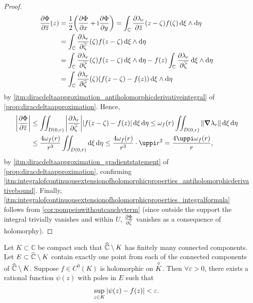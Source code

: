 \begin{proof}
    \begin{align*}
        \pdv{\Phi}{\overline{z}}\qty(z) & =\frac12\qty(\pdv{\Phi}{x}+\mathrm{i}\pdv{\Phi}{y})=\int_{\mathbb{C}}\pdv{\lambda_r}{\overline{z}}\qty(z-\zeta)f(\zeta)\dd{\xi}\wedge\dd{\eta}                                       \\
        & =\int_{\mathbb{C}}\pdv{\lambda_r}{\overline{\zeta}}\qty(\zeta)f(z-\zeta)\dd{\xi}\wedge\dd{\eta}                                                                               \\
        & =\int_{\mathbb{C}}\pdv{\lambda_r}{\overline{\zeta}}\qty(\zeta)f(z-\zeta)\dd{\xi}\wedge\dd{\eta}-f(z)\int_{\mathbb{C}}\pdv{\lambda_r}{\overline{\zeta}}\dd{\xi}\wedge\dd{\eta} \\
        & =\int_{\mathbb{C}}\pdv{\lambda_r}{\overline{\zeta}}\qty(\zeta)\qty(f(z-\zeta)-f(z))\dd{\xi}\wedge\dd{\eta}
    \end{align*}
    by \cref{itm:diracdeltaapproximation_antiholomorphicderivativeintegral} of \cref{prop:diracdeltaapproximation}. Hence,
    \begin{align*}
        \abs{\pdv{\Phi}{\overline{z}}} & \leq\iint_{D(0,r)}\abs{\pdv{\lambda_r}{\overline{\zeta}}}\abs{f(z-\zeta)-f(z)}\dd{\xi}\dd{\eta}\leq\omega_f(r)\iint_{D(0,r)}\norm{\grad{\lambda_r}}\dd{\xi}\dd{\eta} \\
        & \leq\frac{4\omega_f(r)}{r^3}\iint_{D(0,r)}\dd{\xi}\dd{\eta}\leq\frac{4\omega_f(r)}{r^3}\cdot\uppi r^2=\frac{4\uppi\omega_f(r)}{r},
    \end{align*}
    by \cref{itm:diracdeltaapproximation_gradientstatement} of \cref{prop:diracdeltaapproximation}, confirming \cref{itm:integralofcontinuousextensionofholomorphicproperties_antiholomorphicderivativebound}. Finally, \cref{itm:integralofcontinuousextensionofholomorphicproperties_integralformula} follows from \cref{cor:pompeiuwithoutcauchyterm} (since outside the support the integral trivially vanishes and within \(U\), \(\pdv{\Phi}{\overline{\zeta}}\) vanishes as a consequence of holomorphy).
\end{proof}
\begin{theorem}[Mergelyan]\label{thm:mergelyan}
    Let \(K\subset\mathbb{C}\) be compact such that \(\widehat{\mathbb{C}}\setminus K\) has finitely many connected components. Let \(E\subset\widehat{\mathbb{C}}\setminus K\) contain exactly one point from each of the connected components of \(\widehat{\mathbb{C}}\setminus K\). Suppose \(f\in C^0(K)\) is holomorphic on \(\overset{\circ}{K}\). Then \(\forall\varepsilon>0\), there exists a rational function \(\psi(z)\) with poles in \(E\) such that \[\sup_{z\in K}\abs{\psi(z)-f(z)}<\varepsilon.\] %
\end{theorem}
